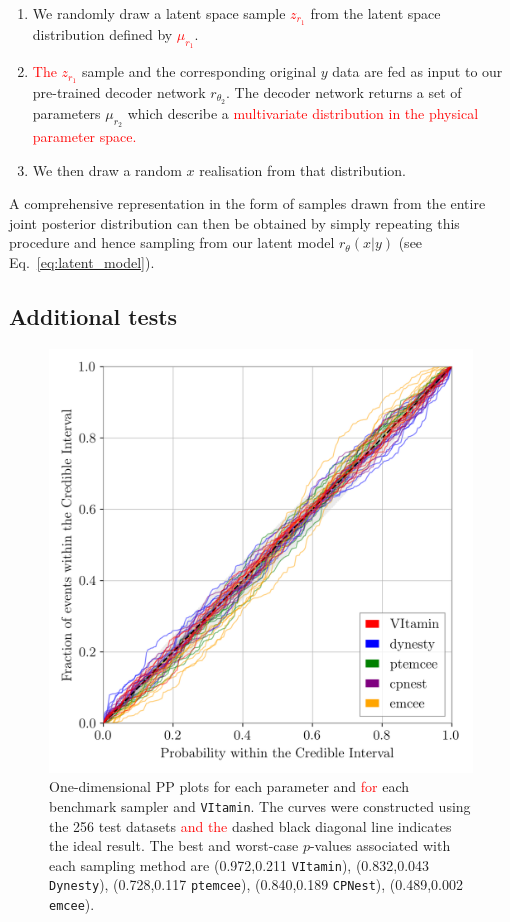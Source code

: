 \documentclass[%
showpacs,
nofootinbib,
 amsmath,amssymb,
 aps,
 twocolumn,
 prl,
 reprint,
floatfix,
]{revtex4-1}
\newcommand{\new}[1]{\textcolor{red}{#1}}
\begin{document}
%
%
\begin{enumerate}
%
\item We randomly draw a latent space sample \new{$z_{r_1}$} from the latent space
distribution defined by \new{$\mu_{r_1}$}.
%
\item \new{The $z_{r_1}$} sample and the corresponding original $y$ data are fed as input to our
pre-trained decoder network $r_{\theta_2}$. The decoder network returns a set
of parameters $\mu_{r_2}$ which describe a \new{multivariate distribution in the physical
parameter space.}
%
\item We then draw a random $x$ realisation from that distribution.
%
\end{enumerate}
%

%
%
A comprehensive representation in the form of samples drawn from the entire
joint posterior distribution can then be obtained by simply repeating this
procedure and hence sampling from our latent model $r_{\theta}(x|y)$ (see
Eq.~\ref{eq:latent_model}).

\subsection{Additional tests}
%
%
\begin{figure}
    \includegraphics[width=\columnwidth]{latest_pp_plot.png}
    \caption{\label{fig:pp_plot} One-dimensional \ac{PP} plots for each
parameter and \new{for} each benchmark sampler and \texttt{VItamin}. The curves were
constructed using the 256 test datasets \new{and the} dashed black diagonal line
indicates the ideal result. The best and worst-case $p$-values associated with each
sampling method are (0.972,0.211 \texttt{VItamin}), (0.832,0.043 \texttt{Dynesty}), (0.728,0.117
\texttt{ptemcee}), (0.840,0.189 \texttt{CPNest}), (0.489,0.002 \texttt{emcee}). 
}
\end{figure}
%
\end{document}

